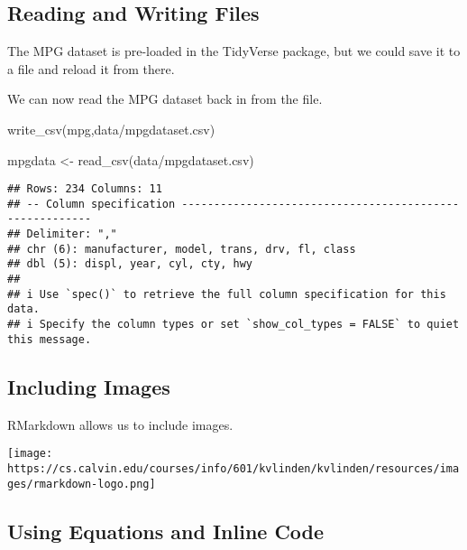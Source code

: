 \documentclass[
]{article}
\newenvironment{Shaded}{\begin{snugshade}}{\end{snugshade}}
\newcommand{\FunctionTok}[1]{\textcolor[rgb]{0.00,0.00,0.00}{#1}}
\newcommand{\NormalTok}[1]{#1}
\newcommand{\OtherTok}[1]{\textcolor[rgb]{0.56,0.35,0.01}{#1}}
\newcommand{\StringTok}[1]{\textcolor[rgb]{0.31,0.60,0.02}{#1}}
\begin{document}
\hypertarget{reading-and-writing-files}{%
\subsection{Reading and Writing Files}\label{reading-and-writing-files}}

The MPG dataset is pre-loaded in the TidyVerse package, but we could
save it to a file and reload it from there.

We can now read the MPG dataset back in from the file.

\begin{Shaded}
\begin{Highlighting}[]
\FunctionTok{write\_csv}\NormalTok{(mpg,}\StringTok{\textquotesingle{}data/mpgdataset.csv\textquotesingle{}}\NormalTok{)}
\end{Highlighting}
\end{Shaded}

\begin{Shaded}
\begin{Highlighting}[]
\NormalTok{mpgdata }\OtherTok{\textless{}{-}} \FunctionTok{read\_csv}\NormalTok{(}\StringTok{\textquotesingle{}data/mpgdataset.csv\textquotesingle{}}\NormalTok{)}
\end{Highlighting}
\end{Shaded}

\begin{verbatim}
## Rows: 234 Columns: 11
## -- Column specification --------------------------------------------------------
## Delimiter: ","
## chr (6): manufacturer, model, trans, drv, fl, class
## dbl (5): displ, year, cyl, cty, hwy
## 
## i Use `spec()` to retrieve the full column specification for this data.
## i Specify the column types or set `show_col_types = FALSE` to quiet this message.
\end{verbatim}

\hypertarget{including-images}{%
\subsection{Including Images}\label{including-images}}

RMarkdown allows us to include images.

\texttt{[image: https://cs.calvin.edu/courses/info/601/kvlinden/kvlinden/resources/images/rmarkdown-logo.png]}

\hypertarget{using-equations-and-inline-code}{%
\subsection{Using Equations and Inline
Code}\label{using-equations-and-inline-code}}
\end{document}
